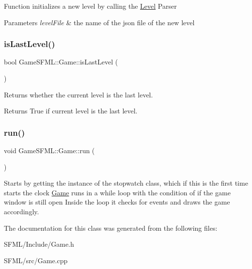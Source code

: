 Function initializes a new level by calling the \hyperlink{classGameSFML_1_1Level}{Level} Parser 
\begin{DoxyParams}{Parameters}
{\em level\+File} & the name of the json file of the new level \\
\hline
\end{DoxyParams}
\mbox{\label{classGameSFML_1_1Game_aa6817ce272ba3c2007b0c5957ef69fdd}} 
\subsubsection{\texorpdfstring{is\+Last\+Level()}{isLastLevel()}}
{\footnotesize\ttfamily bool Game\+S\+F\+M\+L\+::\+Game\+::is\+Last\+Level (\begin{DoxyParamCaption}{ }\end{DoxyParamCaption})}

Returns whether the current level is the last level. \begin{DoxyReturn}{Returns}
True if current level is the last level. 
\end{DoxyReturn}
\mbox{\label{classGameSFML_1_1Game_a4a16f6dac8a77cefae6ff58622791525}} 
\subsubsection{\texorpdfstring{run()}{run()}}
{\footnotesize\ttfamily void Game\+S\+F\+M\+L\+::\+Game\+::run (\begin{DoxyParamCaption}{ }\end{DoxyParamCaption})}

Starts by getting the instance of the stopwatch class, which if this is the first time starts the clock \hyperlink{classGameSFML_1_1Game}{Game} runs in a while loop with the condition of if the game window is still open Inside the loop it checks for events and draws the game accordingly. 

The documentation for this class was generated from the following files\+:\begin{DoxyCompactItemize}
\item 
S\+F\+M\+L/\+Include/Game.\+h\item 
S\+F\+M\+L/src/Game.\+cpp\end{DoxyCompactItemize}
